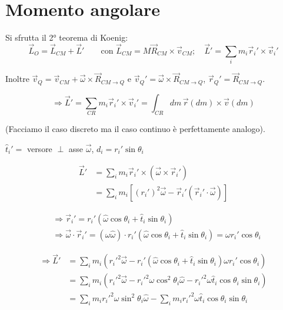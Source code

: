 
\section{Momento angolare}

Si sfrutta il 2° teorema di Koenig:
\begin{equation}
\vec{L}_O = \vec{L}_{CM} + \vec{L}' \qquad \text{con } \vec{L}_{CM} = M\vec{R}_{CM} \times \vec{v}_{CM}; \quad \vec{L}' = \sum_i m_i \vec{r}_i' \times \vec{v}_i'
\end{equation}

Inoltre $\vec{v}_Q = \vec{v}_{CM} + \vec{\omega} \times \vec{R}_{CM \to Q}$ e $\vec{v}_Q' = \vec{\omega} \times \vec{R}_{CM \to Q}$, $\vec{r}_Q' = \vec{R}_{CM \to Q}$.

\begin{equation}
\Rightarrow \vec{L}' = \sum_{CR} m_i \vec{r}_i' \times \vec{v}_i' = \int_{CR} dm\, \vec{r}(dm) \times \vec{v}(dm)
\end{equation}

(Facciamo il caso discreto ma il caso continuo è perfettamente analogo).


$\hat{t}_i' = $ versore $\perp$ asse $\vec{\omega}$, \quad $d_i = r_i' \sin\theta_i$

\begin{align*}
\vec{L}' &= \sum_i m_i \vec{r}_i' \times (\vec{\omega} \times \vec{r}_i') \\
&= \sum_i m_i \left[(r_i')^2 \vec{\omega} - \vec{r}_i'(\vec{r}_i' \cdot \vec{\omega})\right]
\end{align*}

\begin{align*}
&\Rightarrow \vec{r}_i' = r_i'(\hat{\omega}\cos\theta_i + \hat{t}_i \sin\theta_i) \\
&\Rightarrow \vec{\omega} \cdot \vec{r}_i' = (\omega\hat{\omega}) \cdot r_i'(\hat{\omega}\cos\theta_i + \hat{t}_i\sin\theta_i) = \omega r_i' \cos\theta_i
\end{align*}

\begin{align*}
\Rightarrow \vec{L}' &= \sum_i m_i \left(r_i'^2 \vec{\omega} - r_i'(\hat{\omega}\cos\theta_i + \hat{t}_i\sin\theta_i)\omega r_i' \cos\theta_i\right) \\
&= \sum_i m_i \left(r_i'^2 \vec{\omega} - r_i'^2 \omega \cos^2\theta_i \hat{\omega} - r_i'^2 \omega \hat{t}_i \cos\theta_i \sin\theta_i\right) \\
&= \sum_i m_i r_i'^2 \omega \sin^2\theta_i \hat{\omega} - \sum_i m_i r_i'^2 \omega \hat{t}_i \cos\theta_i \sin\theta_i
\end{align*}

